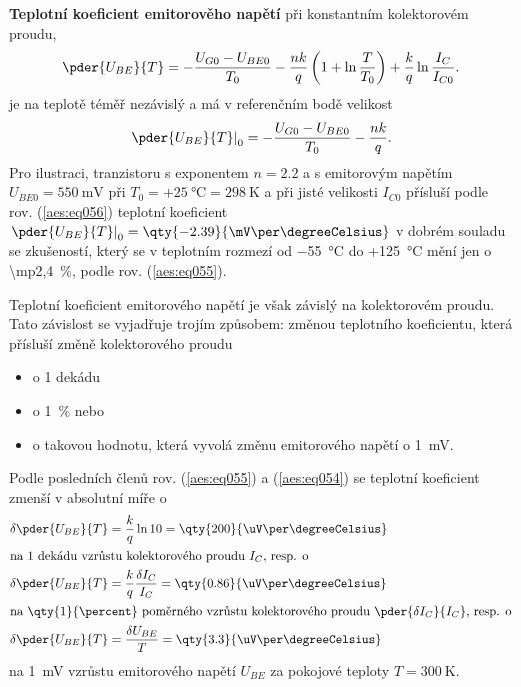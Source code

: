        \textbf{Teplotní koeficient emitorověho napětí} při konstantním kolektorovém proudu,
        \begin{equation}\label{aes:eq055}
          \pder{U_{BE}}{T} = - \dfrac{U_{G0} - U_{BE0}}{T_0} - 
                   \dfrac{nk}{q}\left(1 + \ln\dfrac{T}{T_0}\right) +
                   \dfrac{k}{q}\ln\dfrac{I_C}{I_{C0}}.
        \end{equation}
        je na teplotě téměř nezávislý a má v referenčním bodě velikost
        \begin{equation}\label{aes:eq056}
          \left.\pder{U_{BE}}{T}\right\rvert_0 = - \dfrac{U_{G0} - U_{BE0}}{T_0} - \dfrac{nk}{q}.
        \end{equation}
        Pro ilustraci, tranzistoru s exponentem \(n = \num{2.2}\) a s emitorovým napětím \(U_{BE0} =
        \qty{550}{\mV}\) při \(T_0 = +\qty{25}{\degreeCelsius} = \qty{298}{\K}\) a při jisté velikosti
        \(I_{C0}\) přísluší podle rov. (\ref{aes:eq056}) teplotní koeficient
        \(\left.\pder{U_{BE}}{T}\right\rvert_0 = \qty{-2.39}{\mV\per\degreeCelsius}\) v dobrém
        souladu se zkušeností, který se v teplotním rozmezí od \qty{-55}{\degreeCelsius} do
        +\qty{125}{\degreeCelsius} mění jen o \qty{\mp2,4}{\percent}, podle rov. (\ref{aes:eq055}).

        Teplotní koeficient emitorového napětí je však závislý na kolektorovém proudu. Tato
        závislost se vyjadřuje trojím způsobem: změnou teplotního koeficientu, která přísluší změně
        kolektorového proudu
        \begin{itemize}[noitemsep]
          \item o 1 dekádu
          \item o \qty{1}{\percent} nebo
          \item o takovou hodnotu, která vyvolá změnu emitorového napětí o \qty{1}{\mV}.                 
        \end{itemize}

        Podle posledních členů rov. (\ref{aes:eq055}) a (\ref{aes:eq054}) se teplotní koeficient
        zmenší v absolutní míře o
        \begin{subequations}\label{aes:eq057}
          \begin{align}
            \delta\pder{U_{BE}}{T} &= \dfrac{k}{q}\ln10 
                                    = \qty{200}{\uV\per\degreeCelsius}    \label{aes:eq057a}   \\
            \shortintertext{na 1 dekádu vzrůstu kolektorového proudu \(I_C\), resp. o}
            \delta\pder{U_{BE}}{T} &= \dfrac{k}{q}\dfrac{\delta I_C}{I_C}
                                    = \qty{0.86}{\uV\per\degreeCelsius}   \label{aes:eq057b}   \\
            \shortintertext{na \qty{1}{\percent} poměrného vzrůstu kolektorového proudu 
                            \(\pder{\delta I_C}{I_C}\), resp. o}
            \delta\pder{U_{BE}}{T} &= \dfrac{\delta U_{BE}}{T}
                                    = \qty{3.3}{\uV\per\degreeCelsius}    \label{aes:eq057c}
          \end{align}
        \end{subequations}
        na \qty{1}{\mV} vzrůstu emitorového napětí \(U_{BE}\) za pokojové teploty \(T=\qty{300}{\K}\).

